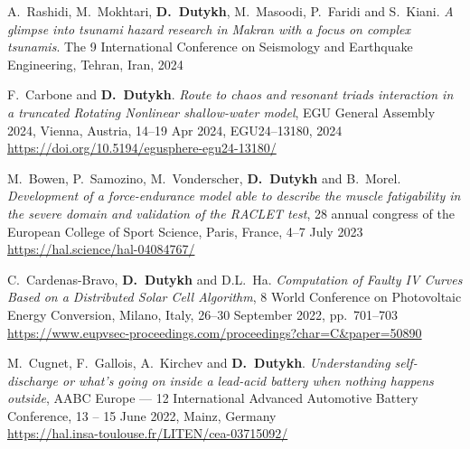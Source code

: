 \begin{etaremune}
  \item A.~Rashidi, M.~Mokhtari, \textbf{D.~Dutykh}, M.~Masoodi, P.~Faridi and S.~Kiani. \textit{A glimpse into tsunami hazard research in Makran with a focus on complex tsunamis}. The 9 International Conference on Seismology and Earthquake Engineering, Tehran, Iran, 2024 %

  \item F.~Carbone and \textbf{D.~Dutykh}. \textit{Route to chaos and resonant triads interaction in a truncated Rotating Nonlinear shallow-water model}, EGU General Assembly 2024, Vienna, Austria, 14--19 Apr 2024, EGU24--13180, 2024 \\ %
  \url{https://doi.org/10.5194/egusphere-egu24-13180/}



  \item M.~Bowen, P.~Samozino, M.~Vonderscher, \textbf{D.~Dutykh} and B.~Morel. \textit{Development of a force-endurance model able to describe the muscle fatigability in the severe domain and validation of the RACLET test}, 28 annual congress of the European College of Sport Science, Paris, France, 4--7 July 2023 \\ %
  \url{https://hal.science/hal-04084767/}



  \item C.~Cardenas-Bravo, \textbf{D.~Dutykh} and D.L.~Ha. \textit{Computation of Faulty IV Curves Based on a Distributed Solar Cell Algorithm}, 8 World Conference on Photovoltaic Energy Conversion, Milano, Italy, 26--30 September 2022, pp.~701--703 \\ %
  \url{https://www.eupvsec-proceedings.com/proceedings?char=C&paper=50890}
  
  \item M.~Cugnet, F.~Gallois, A.~Kirchev and \textbf{D.~Dutykh}. \textit{Understanding self-discharge or what's going on inside a lead-acid battery when nothing happens outside}, AABC Europe --- 12 International Advanced Automotive Battery Conference, 13 -- 15 June 2022, Mainz, Germany \\
  \url{https://hal.insa-toulouse.fr/LITEN/cea-03715092/}
  

\end{etaremune}

